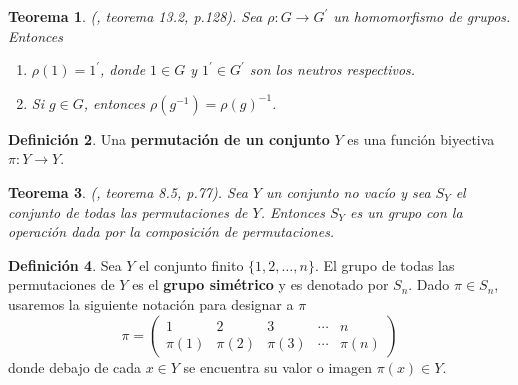 \documentclass[12pt]{book}
\newtheorem{theorem}{Teorema}[section]
\theoremstyle{definition}
\newtheorem{definition}[theorem]{Definición}
\DeclareMathOperator{\im}{im}
\newcounter{in}
\newcounter{ini}
\begin{document}
\begin{theorem}{\normalfont (\cite{fraleigh}, teorema 13.2, p.128)}.
  Sea $\rho:G\rightarrow G^{'}$ un homomorfismo de grupos. Entonces
  \begin{enumerate}
    \item $\rho(1)=1^{'}$, donde $1\in G$ y  $1^{'}\in G^{'}$ son los
    neutros respectivos. 
    \item Si $g\in G$, entonces $\rho(g^{-1})=\rho (g)^{-1}$.
  \end{enumerate}
\end{theorem}


\begin{definition}
  Una \textbf{permutación de un conjunto} $Y$ es una función biyectiva
  $\pi:Y\rightarrow Y$.
\end{definition}

\begin{theorem}{\normalfont (\cite{fraleigh}, teorema 8.5, p.77)}.
  Sea $Y$ un conjunto no vacío y sea $S_{Y}$ el conjunto de todas las
  permutaciones de $Y$. Entonces $S_{Y}$ es un grupo con la operación dada por la composición de
  permutaciones.
\end{theorem}

\begin{definition}
  Sea $Y$ el conjunto finito $\{1,2,\ldots,n\}$. El grupo de todas las
  permutaciones de $Y$ es el\textbf{ grupo simétrico} y es denotado
  por $S_{n}$. Dado $\pi \in S_{n}$, usaremos la siguiente notación
  para designar a $\pi$
  \[ \pi=\left(
    \begin{array}{ccccc}
      1 & 2 & 3 & \cdots & n\\
      \pi(1) & \pi(2) & \pi(3) & \cdots & \pi(n) 
    \end{array} 
  \right)\] 
  donde debajo de cada $x\in Y$ se encuentra su valor o imagen
  $\pi(x)\in Y$.
\end{definition}
\end{document}
